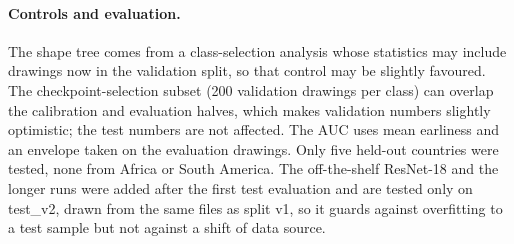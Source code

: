 \paragraph{Controls and evaluation.} The shape tree comes from a class-selection analysis whose
statistics may include drawings now in the validation split, so that control may be slightly
favoured. The checkpoint-selection subset (200 validation drawings per class) can overlap the
calibration and evaluation halves, which makes validation numbers slightly optimistic; the test
numbers are not affected. The AUC uses mean earliness and an envelope taken on the evaluation
drawings. Only five held-out countries were tested, none from Africa or South America. The
off-the-shelf ResNet-18 and the longer runs were added after the first test evaluation and are
tested only on test\_v2, drawn from the same files as split v1, so it guards against overfitting
to a test sample but not against a shift of data source.
